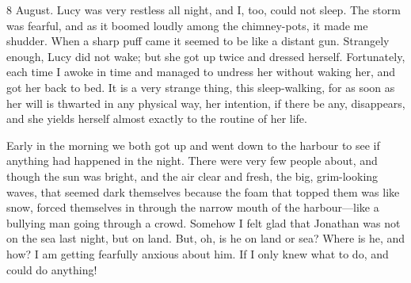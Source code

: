 \begin{diary}{8 August.}
Lucy was very restless all night, and I, too, could not sleep. The storm was fearful, and as it boomed loudly among the chimney-pots, it made me shudder. When a sharp puff came it seemed to be like a distant gun. Strangely enough, Lucy did not wake; but she got up twice and dressed herself. Fortunately, each time I awoke in time and managed to undress her without waking her, and got her back to bed. It is a very strange thing, this sleep-walking, for as soon as her will is thwarted in any physical way, her intention, if there be any, disappears, and she yields herself almost exactly to the routine of her life.

Early in the morning we both got up and went down to the harbour to see if anything had happened in the night. There were very few people about, and though the sun was bright, and the air clear and fresh, the big, grim-looking waves, that seemed dark themselves because the foam that topped them was like snow, forced themselves in through the narrow mouth of the harbour—like a bullying man going through a crowd. Somehow I felt glad that Jonathan was not on the sea last night, but on land. But, oh, is he on land or sea? Where is he, and how? I am getting fearfully anxious about him. If I only knew what to do, and could do anything!
\end{diary}
 
